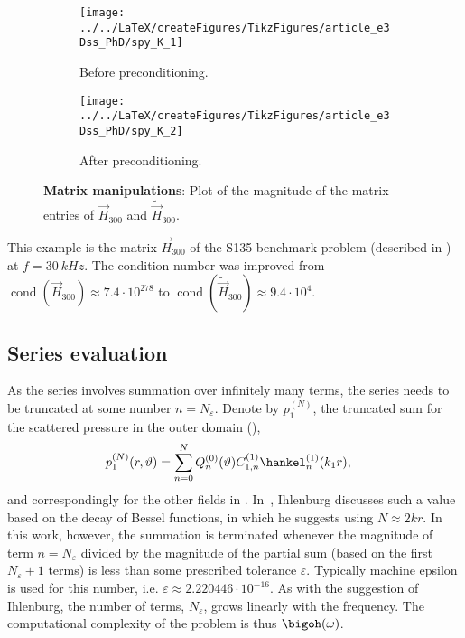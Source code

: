 \begin{figure}
	\centering
	\begin{subfigure}{\textwidth}
		\centering
		\texttt{[image: ../../LaTeX/createFigures/TikzFigures/article\_e3Dss\_PhD/spy\_K\_1]}
		\caption{Before preconditioning.}
		\label{Fig1:Spy2K}
	\end{subfigure}
	\par\bigskip
	\begin{subfigure}{\textwidth}
		\centering
		\texttt{[image: ../../LaTeX/createFigures/TikzFigures/article\_e3Dss\_PhD/spy\_K\_2]}
		\caption{After preconditioning.}
		\label{Fig1:Spy2K2}
	\end{subfigure}
	\caption{\textbf{Matrix manipulations}: Plot of the magnitude of the matrix entries of $\vec{H}_{300}$ and $\tilde{\vec{H}}_{300}$.}
	\label{Fig1:SpyK}
\end{figure}
This example is the matrix $\vec{H}_{300}$ of the S135 benchmark problem (described in ) at $f=\SI{30}{kHz}$. The condition number was improved from $\operatorname{cond}(\vec{H}_{300}) \approx 7.4\cdot 10^{278}$ to $\operatorname{cond}(\tilde{\vec{H}}_{300}) \approx 9.4\cdot 10^4$.

\subsection{Series evaluation}
\label{Subsec1:seriesEval}
As the series involves summation over infinitely many terms, the series needs to be truncated at some number $n=N_\varepsilon$. Denote by $p_1^{(N)}$, the truncated sum for the scattered pressure in the outer domain (), 
\begin{align}\label{Eq1:truncated_p1}
p_1^{(N)}(r,\vartheta) &= \sum_{n=0}^N Q_n^{(0)}(\vartheta) C_{1,n}^{(1)} \hankel^{(1)}_n(k_1 r),
\end{align}
and correspondingly for the other fields in .
In~\cite[pp. 32-35]{Ihlenburg1998fea}, Ihlenburg discusses such a value based on the decay of Bessel functions, in which he suggests using $N\approx 2kr$. In this work, however, the summation is terminated whenever the magnitude of term $n=N_\varepsilon$ divided by the magnitude of the partial sum (based on the first $N_\varepsilon+1$ terms) is less than some prescribed tolerance $\varepsilon$. Typically machine epsilon is used for this number, i.e. $\varepsilon \approx 2.220446\cdot 10^{-16}$. As with the suggestion of Ihlenburg, the number of terms, $N_\varepsilon$, grows linearly with the frequency. The computational complexity of the problem is thus $\bigoh(\omega)$. 

